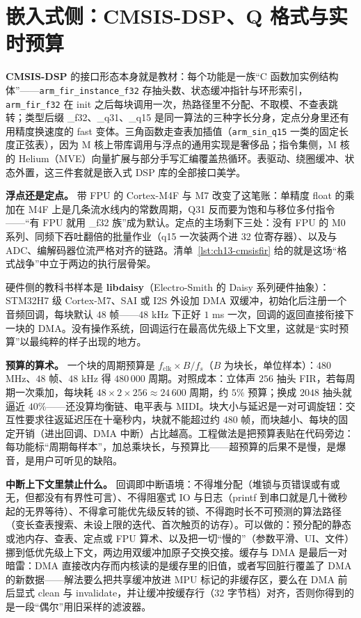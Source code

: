 \documentclass[12pt,a4paper,fontset=fandol]{ctexbook}
\newcommand{\Tp}[1]{\texttt{#1}}
\newcommand{\Bk}{\allowbreak}
\newcommand{\Lib}[1]{\textbf{#1}}
\begin{document}
\section{嵌入式侧：CMSIS-DSP、Q 格式与实时预算}

\Lib{CMSIS-DSP} 的接口形态本身就是教材：每个功能是一族``C 函数加实例结构体''——\Tp{arm\Bk\_fir\Bk\_instance\Bk\_f32} 存抽头数、状态缓冲指针与环形索引，\Tp{arm\_fir\_f32} 在 init 之后每块调用一次，热路径里不分配、不取模、不查表跳转；类型后缀 \_f32、\_q31、\_q15 是同一算法的三种字长分身，定点分身里还有用精度换速度的 fast 变体。三角函数走查表加插值（\Tp{arm\_sin\_q15} 一类的固定长度正弦表），因为 M 核上带库调用与浮点的通用实现是奢侈品；指令集侧，M 核的 Helium（MVE）向量扩展与部分手写汇编覆盖热循环。表驱动、绕圈缓冲、状态外置，这三件套就是嵌入式 DSP 库的全部接口美学。

\textbf{浮点还是定点。} 带 FPU 的 Cortex-M4F 与 M7 改变了这笔账：单精度 float 的乘加在 M4F 上是几条流水线内的常数周期，Q31 反而要为饱和与移位多付指令——``有 FPU 就用 \_f32 族''成为默认。定点的主场剩下三处：没有 FPU 的 M0 系列、同频下吞吐翻倍的批量作业（q15 一次装两个进 32 位寄存器）、以及与 ADC、编解码器位流严格对齐的链路。清单~\ref{lst:ch13-cmsisfir} 给的就是这场``格式战争''中立于两边的执行层骨架。

硬件侧的教科书样本是 \Lib{libdaisy}（Electro-Smith 的 Daisy 系列硬件抽象）：STM32H7 级 Cortex-M7、SAI 或 I2S 外设加 DMA 双缓冲，初始化后注册一个音频回调，每块默认 $48$ 帧——$48$ kHz 下正好 $1$ ms 一次，回调的返回直接衔接下一块的 DMA。没有操作系统，回调运行在最高优先级上下文里，这就是``实时预算''以最纯粹的样子出现的地方。

\textbf{预算的算术。} 一个块的周期预算是 $f_{\text{clk}} \times B / f_s$（$B$ 为块长，单位样本）：$480$ MHz、$48$ 帧、$48$ kHz 得 $480\,000$ 周期。对照成本：立体声 $256$ 抽头 FIR，若每周期一次乘加，每块耗 $48 \times 2 \times 256 \approx 24\,600$ 周期，约 $5\%$ 预算；换成 $2048$ 抽头就逼近 $40\%$——还没算均衡链、电平表与 MIDI。块大小与延迟是一对可调旋钮：交互性要求往返延迟压在十毫秒内，块就不能超过约 $480$ 帧，而块越小、每块的固定开销（进出回调、DMA 中断）占比越高。工程做法是把预算表贴在代码旁边：每功能标``周期每样本''，加总乘块长，与预算比——超预算的后果不是慢，是爆音，是用户可听见的缺陷。

\textbf{中断上下文里禁止什么。} 回调即中断语境：不得堆分配（堆锁与页错误或有或无，但都没有有界性可言）、不得阻塞式 IO 与日志（printf 到串口就是几十微秒起的无界等待）、不得拿可能优先级反转的锁、不得跑时长不可预测的算法路径（变长查表搜索、未设上限的迭代、首次触页的访存）。可以做的：预分配的静态或池内存、查表、定点或 FPU 算术、以及把一切``慢的''（参数平滑、UI、文件）挪到低优先级上下文，两边用双缓冲加原子交换交接。缓存与 DMA 是最后一对暗雷：DMA 直接改内存而内核读的是缓存里的旧值，或者写回脏行覆盖了 DMA 的新数据——解法要么把共享缓冲放进 MPU 标记的非缓存区，要么在 DMA 前后显式 clean 与 invalidate，并让缓冲按缓存行（$32$ 字节档）对齐，否则你得到的是一段``偶尔''用旧采样的滤波器。
\end{document}
